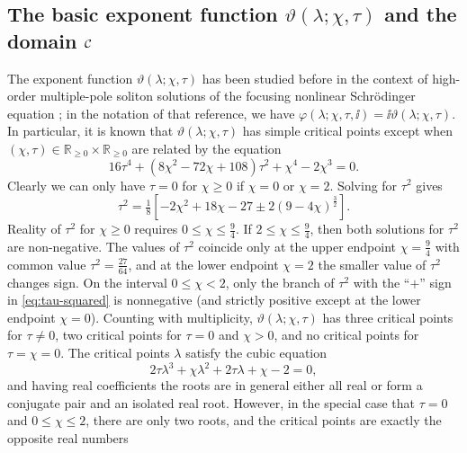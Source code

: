 \subsection{The basic exponent function $\vartheta(\lambda;\chi,\tau)$ and the domain $\mathcal{C}$}
\label{sec:basic-exponent}
The exponent function $\vartheta(\lambda;\chi,\tau)$ has been studied before in the context of high-order multiple-pole soliton solutions of the focusing nonlinear Schr\"odinger equation \cite{BilmanBW19}; in the notation of that reference, we have $\varphi(\lambda;\chi,\tau,\ii)=\ii\vartheta(\lambda;\chi,\tau)$.  In particular, it is known that $\vartheta(\lambda;\chi,\tau)$ has simple critical points except when $(\chi,\tau)\in\mathbb{R}_{\ge 0}\times\mathbb{R}_{\ge 0}$ are related by the equation
\begin{equation}
16\tau^4 + (8\chi^2-72\chi+108)\tau^2 +\chi^4-2\chi^3=0.
\label{eq:boundary-curve}
\end{equation}
Clearly we can only have $\tau=0$ for $\chi\ge 0$ if $\chi=0$ or $\chi=2$.  
Solving for $\tau^2$ gives
\begin{equation}
\tau^2 
=\tfrac{1}{8}\left[-2\chi^2+18\chi-27\pm 2(9-4\chi)^\frac{3}{2}\right].
\label{eq:tau-squared}
\end{equation}
Reality of $\tau^2$ for $\chi\ge 0$ requires $0\le\chi\le\tfrac{9}{4}$.  If $2\le\chi\le\tfrac{9}{4}$, then both solutions for $\tau^2$ are non-negative.  The values of $\tau^2$ coincide only at the upper endpoint $\chi=\tfrac{9}{4}$ with common value $\tau^2=\tfrac{27}{64}$, and at the lower endpoint $\chi=2$ the smaller value of $\tau^2$ changes sign.  On the interval $0\le\chi< 2$, only the branch of $\tau^2$ with the ``$+$'' sign in \eqref{eq:tau-squared} is nonnegative (and strictly positive except at the lower endpoint $\chi=0$).  Counting with multiplicity, $\vartheta(\lambda;\chi,\tau)$ has three critical points for $\tau\neq 0$, two critical points for $\tau=0$ and $\chi>0$, and no critical points for $\tau=\chi=0$.  The critical points $\lambda$ satisfy the cubic equation
\begin{equation}
2\tau\lambda^3+\chi\lambda^2 + 2\tau\lambda +\chi-2=0,
\end{equation}
and having real coefficients the roots are in general either all real or form a conjugate pair and an isolated real root.  However, in the special case that $\tau=0$ and $0\le\chi\le 2$, there are only two roots, and the critical points are exactly the opposite real numbers
